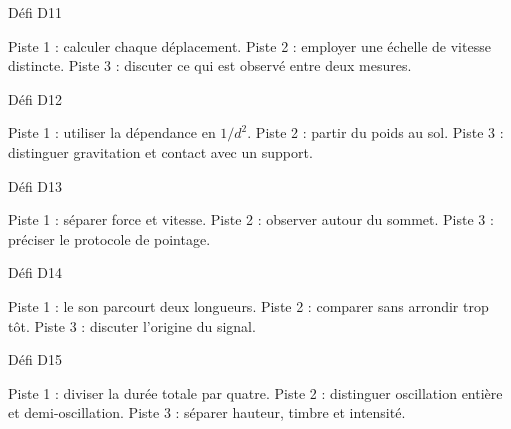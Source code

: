 \fontsize{10}{13}\selectfont
\par\addvspace{3mm}\noindent\begin{minipage}{\linewidth}
{\otSemi\color{otNavy}Défi D11}\label{indice-11}\par\vspace{1mm}
Piste 1 : calculer chaque déplacement. Piste 2 : employer une échelle de vitesse distincte. Piste 3 : discuter ce qui est observé entre deux mesures.
\end{minipage}\par

\par\addvspace{3mm}\noindent\begin{minipage}{\linewidth}
{\otSemi\color{otNavy}Défi D12}\label{indice-12}\par\vspace{1mm}
Piste 1 : utiliser la dépendance en $1/d^2$. Piste 2 : partir du poids au sol. Piste 3 : distinguer gravitation et contact avec un support.
\end{minipage}\par

\par\addvspace{3mm}\noindent\begin{minipage}{\linewidth}
{\otSemi\color{otNavy}Défi D13}\label{indice-13}\par\vspace{1mm}
Piste 1 : séparer force et vitesse. Piste 2 : observer autour du sommet. Piste 3 : préciser le protocole de pointage.
\end{minipage}\par

\par\addvspace{3mm}\noindent\begin{minipage}{\linewidth}
{\otSemi\color{otNavy}Défi D14}\label{indice-14}\par\vspace{1mm}
Piste 1 : le son parcourt deux longueurs. Piste 2 : comparer sans arrondir trop tôt. Piste 3 : discuter l’origine du signal.
\end{minipage}\par

\par\addvspace{3mm}\noindent\begin{minipage}{\linewidth}
{\otSemi\color{otNavy}Défi D15}\label{indice-15}\par\vspace{1mm}
Piste 1 : diviser la durée totale par quatre. Piste 2 : distinguer oscillation entière et demi-oscillation. Piste 3 : séparer hauteur, timbre et intensité.
\end{minipage}\par


